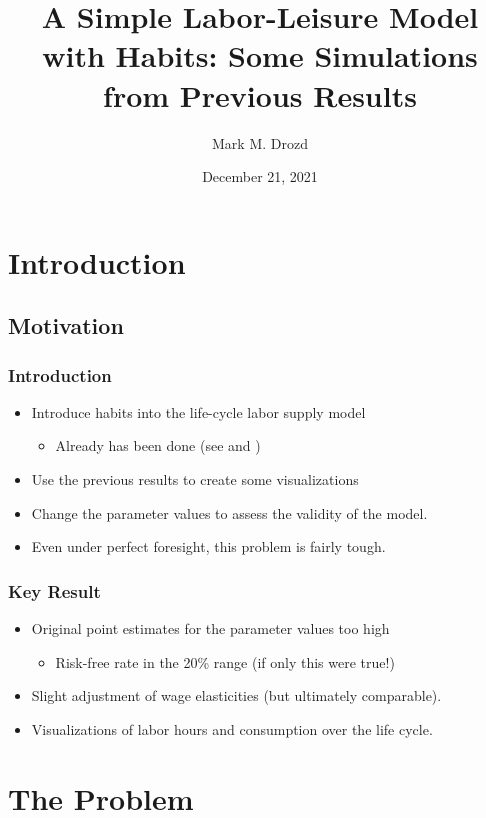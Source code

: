 \documentclass[pdflatex]{beamer}
\title[Project MMD]{A Simple Labor-Leisure Model with Habits: Some Simulations from Previous Results}
\author[Drozd]{Mark M. Drozd}
\institute[JHU]{Johns Hopkins University}
\date[\today]{December 21, 2021}
\begin{document}


\begin{frame}[plain]
  \titlepage
\end{frame}


\section{Introduction}
\subsection{Motivation}

\begin{frame}
\frametitle{Introduction}

\begin{itemize}
\item Introduce habits into the life-cycle labor supply model
  \begin{itemize}
  \item Already has been done (see \cite{bover1991relaxing} and \cite{kubin2002labour})
  \end{itemize}
\item Use the previous results to create some visualizations
  \item Change the parameter values to assess the validity of the model. 
\item Even under perfect foresight, this problem is fairly tough.
  \end{itemize}
\end{frame}

\begin{frame}
  \frametitle{Key Result}
\begin{itemize}
\item Original point estimates for the parameter values too high
  \begin{itemize}
  \item Risk-free rate in the 20\% range (if only this were true!)
  \end{itemize}
\item Slight adjustment of wage elasticities (but ultimately comparable).
  \item Visualizations of labor hours and consumption over the life cycle.
\end{itemize}
\end{frame}

\section{The Problem}
\end{document}
